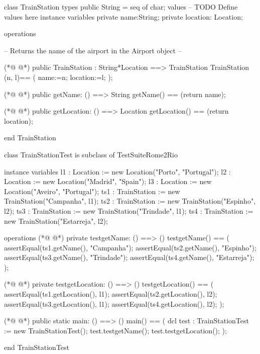\begin{vdmpp}[breaklines=true]
class TrainStation 
types
public String = seq of char;
values
-- TODO Define values here
instance variables
private name:String;
private location: Location;

operations

-- Returns the name of the airport in the Airport object --

(*@
\label{TrainStation:14}
@*)
public TrainStation : String*Location ==> TrainStation
TrainStation (n, l)== (
 name:=n;
 location:=l;
 );
 
(*@
\label{getName:20}
@*)
public getName: () ==> String
getName() == (return name);

(*@
\label{getLocation:23}
@*)
public getLocation: () ==> Location
getLocation() == (return location);
    

end TrainStation

class TrainStationTest is subclass of TestSuiteRome2Rio

 instance variables
 l1 :  Location := new Location("Porto", "Portugal");
 l2 : Location := new Location("Madrid", "Spain");
 l3 : Location := new Location("Aveiro", "Portugal");
 ts1 : TrainStation := new TrainStation("Campanha", l1);
 ts2 : TrainStation := new TrainStation("Espinho", l2);
 ts3 : TrainStation := new TrainStation("Trindade", l1);
 ts4 : TrainStation := new TrainStation("Estarreja", l2);
 
 
 operations
(*@
\label{testgetName:42}
@*)
  private testgetName: () ==> ()
   testgetName() == (
    assertEqual(ts1.getName(), "Campanha");
    assertEqual(ts2.getName(), "Espinho");
    assertEqual(ts3.getName(), "Trindade");
    assertEqual(ts4.getName(), "Estarreja");
   );
   
(*@
\label{testgetLocation:50}
@*)
   private testgetLocation: () ==> ()
   testgetLocation() == (
    assertEqual(ts1.getLocation(), l1);
    assertEqual(ts2.getLocation(), l2);
    assertEqual(ts3.getLocation(), l1);
    assertEqual(ts4.getLocation(), l2);
   );
   
   
(*@
\label{main:59}
@*)
 public static main: () ==> ()
      main() ==
      (
       dcl test : TrainStationTest := new TrainStationTest();
       test.testgetName();
       test.testgetLocation();
       );
       
end TrainStationTest
\end{vdmpp}
